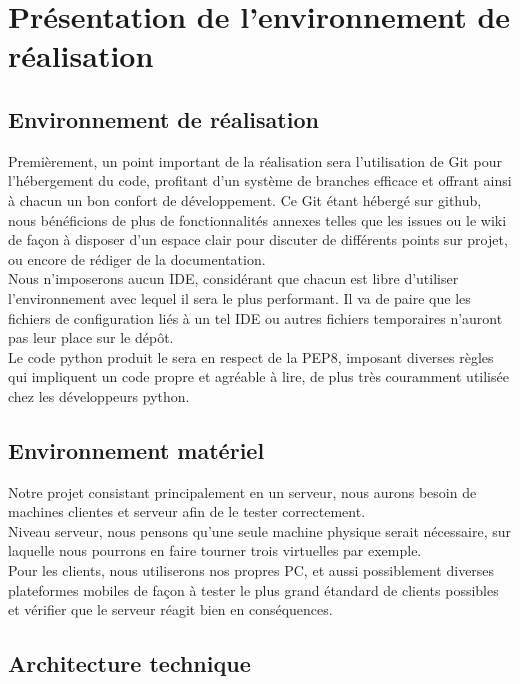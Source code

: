 \documentclass[12pt]{report}
\begin{document}
\chapter{Présentation de l'environnement de réalisation}
\thispagestyle{EIP} %
\section{Environnement de réalisation}
Premièrement, un point important de la réalisation sera l'utilisation de Git pour l'hébergement du code, profitant d'un système de branches efficace et offrant ainsi à chacun un bon confort de développement. Ce Git étant hébergé sur github, nous bénéficions de plus de fonctionnalités annexes telles que les issues ou le wiki de façon à disposer d'un espace clair pour discuter de différents points sur projet, ou encore de rédiger de la documentation.\\

Nous n'imposerons aucun IDE, considérant que chacun est libre d'utiliser l'environnement avec lequel il sera le plus performant. Il va de paire que les fichiers de configuration liés à un tel IDE ou autres fichiers temporaires n'auront pas leur place sur le dépôt.\\

Le code python produit le sera en respect de la PEP8, imposant diverses règles qui impliquent un code propre et agréable à lire, de plus très couramment utilisée chez les développeurs python.

\section{Environnement matériel}
Notre projet consistant principalement en un serveur, nous aurons besoin de machines clientes et serveur afin de le tester correctement.\\

Niveau serveur, nous pensons qu'une seule machine physique serait nécessaire, sur laquelle nous pourrons en faire tourner trois virtuelles par exemple.\\

Pour les clients, nous utiliserons nos propres PC, et aussi possiblement diverses plateformes mobiles de façon à tester le plus grand étandard de clients possibles et vérifier que le serveur réagit bien en conséquences.

\section{Architecture technique}

\end{document}
